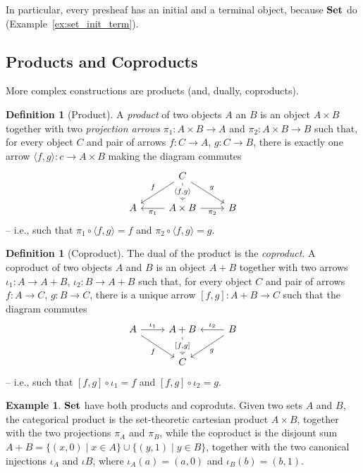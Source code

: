 \documentclass[a4paper, twoside,openright]{report}
\theoremstyle{plain}
\theoremstyle{definition}
\newtheorem{definition}[theorem]{Definition}
\newtheorem{example}[theorem]{Example}
\begin{document}
In particular, every presheaf has an initial and a terminal object, because $\mathbf{Set}$ do (Example~\ref{ex:set_init_term}).

\subsection{Products and Coproducts}

More complex constructions are products (and, dually, coproducts).

\begin{definition}[Product]
    A \emph{product} of two objects $A$ an $B$ is an object $A \times B$ together with two \emph{projection arrows} $\pi_1:A\times B \rightarrow A$ and $\pi_2: A \times B \rightarrow B$ such that, for every object $C$ and pair of arrows $f: C \rightarrow A$, $g: C \rightarrow B$, there is exactly one arrow $\langle f, g \rangle : c \rightarrow A \times B$ making the diagram commutes
    \[
        \begin{tikzcd}
                    & C \arrow[dl, "f" swap] \arrow[d, dashed, "{\langle f, g \rangle}" description] \arrow[dr, "g"] & \\
                A   & A \times B  \arrow[l, "{\pi_1}"] \arrow[r, "{\pi_2}" swap]    &  B    
        \end{tikzcd}
    \]
   -- i.e., such that $\pi_1 \circ \langle f, g \rangle = f$ and $\pi_2 \circ \langle f, g \rangle  = g$.
    
\end{definition}


\begin{definition}[Coproduct]
    The dual of the product is the \emph{coproduct}.
    A coproduct of two objects $A$ and $B$ is an object $A + B$ together with two arrows $\iota_1:A\rightarrow A+B$, $\iota_2: B \rightarrow A + B$ such that, for every object $C$ and pair of arrows $f:A \rightarrow C$, $g:B \rightarrow C$, there is a unique arrow $[f, g] : A + B \rightarrow C$ such that the diagram commutes
    \[
        \begin{tikzcd}
            A \arrow[r, "{\iota_1}"] \arrow[dr, "f" swap] & A+B \arrow[d, dashed, "{[f,g]}" description] & B \arrow[l, "{\iota_2}" swap] \arrow[dl, "g"] \\
            & C & 
        \end{tikzcd}
    \]
    -- i.e., such that $[f, g] \circ \iota_1 = f$ and $[f, g] \circ \iota_2 = g$.
\end{definition}

\begin{example}
    $\mathbf{Set}$ have both products and coproduts. Given two sets $A$ and $B$, the categorical product is the set-theoretic cartesian product $A \times B$, together with the two projections $\pi_A$ and $\pi_B$, while the coproduct is the disjount sum $A + B = \{ (x, 0) \mid x \in A\} \cup \{(y, 1) \mid y \in B \}$, together with the two canonical injections $\iota_A$ and $\iota B$, where $\iota_A(a) = (a, 0)$ and $\iota_B(b) = (b, 1)$. 
\end{example}
\end{document}
